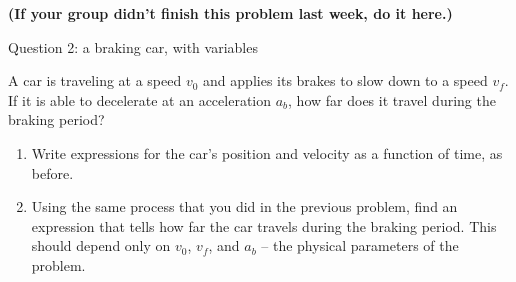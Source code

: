 \documentclass[12pt]{article}
\begin{document}
\vspace*{\fill}
\begin{center}
\bf (If your group didn't finish this problem last week, do it here.) 
\end{center}

\newpage

\centerline{\Large Question 2: a braking car, with variables}

A car is traveling at a speed $v_0$ and applies its brakes to slow down to a speed $v_f$. If it is able to decelerate at an acceleration $a_b$, how far does it travel during the braking period?

\begin{enumerate}
\item Write expressions for the car's position and velocity as a function of time, as before.

\vspace{1in}


\item Using the same process that you did in the previous problem, find an expression that tells how far the car travels during the braking period. This should depend only on $v_0$, $v_f$, and $a_b$ -- the physical parameters of the problem. 

\vspace{3in}

\end{enumerate}
\newpage
\end{document}
